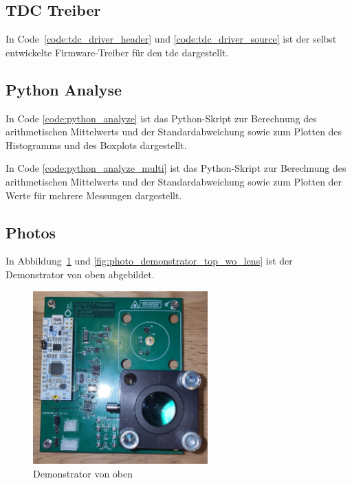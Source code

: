 \subsection{TDC Treiber}\label{sec:tdc_driver}

In Code~\ref{code:tdc_driver_header} und \ref{code:tdc_driver_source} ist der selbst entwickelte Firmware-Treiber für
den \acrshort{tdc} dargestellt.




\subsection{Python Analyse}\label{sec:python_analyze}

In Code \ref{code:python_analyze} ist das Python-Skript zur Berechnung des arithmetischen Mittelwerts und der
Standardabweichung sowie zum Plotten des Histogramms und des Boxplots dargestellt.



In Code \ref{code:python_analyze_multi} ist das Python-Skript zur Berechnung des arithmetischen Mittelwerts und der
Standardabweichung sowie zum Plotten der Werte für mehrere Messungen dargestellt.



\pagebreak

\subsection{Photos}\label{sec:photos}

In Abbildung~\ref{fig:photo_demonstrator_top} und \ref{fig:photo_demonstrator_top_wo_lens} ist der Demonstrator von oben
abgebildet.

\begin{figure}[H]
    \centering
    \includegraphics[width=0.6\textwidth]{graphics/photo_demonstrator_top.jpg}
    \caption{Demonstrator von oben}\label{fig:photo_demonstrator_top}
\end{figure}

